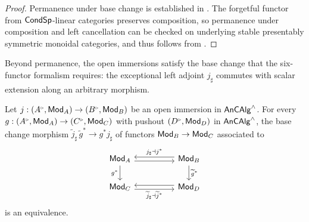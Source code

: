 \begin{proof}
    Permanence under base change is established in . The forgetful functor from $\mathsf{Cond}\mathsf{Sp}$-linear categories preserves composition, so permanence under composition and left cancellation can be checked on underlying stable presentably symmetric monoidal categories, and thus follows from \cite[Prop. 6.5 \& Cor. 6.6]{Complex}. 
\end{proof}
Beyond permanence, the open immersions satisfy the base change that the six-functor formalism requires: the exceptional left adjoint $j_{\sharp}$ commutes with scalar extension along an arbitrary morphism.
\begin{proposition}\label{prop: base change for open immersions}
    Let $j:(A^{\tri},\Mod_{A})\to(B^{\tri},\Mod_{B})$ be an open immersion in $\mathsf{An}\mathsf{CAlg}^{\wedge}$. For every $g:(A^{\tri},\Mod_{A})\to(C^{\tri},\Mod_{C})$ with pushout $(D^{\tri},\Mod_{D})$ in $\mathsf{An}\mathsf{CAlg}^{\wedge}$, the base change morphism $\widetilde{j}_{\sharp}\,\widetilde{g}^{*}\to g^{*}j_{\sharp}$ of functors $\mathsf{Mod}_{B}\to\mathsf{Mod}_{C}$ associated to
    \begin{equation}\label{eqn: open immersion base change}
        \begin{tikzcd}
            {\Mod_{A}} && {\Mod_{B}} \\
            {\Mod_{C}} && {\Mod_{D}}
            \arrow[shift right, from=1-1, to=1-3]
            \arrow["{g^{*}}"', from=1-1, to=2-1]
            \arrow["{j_{\sharp}\dashv j^{*}}"', shift right, from=1-3, to=1-1]
            \arrow["{\widetilde{g}^{*}}", from=1-3, to=2-3]
            \arrow["{\widetilde{j}_{\sharp}\dashv\widetilde{j}^{*}}"', shift right, from=2-1, to=2-3]
            \arrow[shift right, from=2-3, to=2-1]
        \end{tikzcd}
    \end{equation}
    is an equivalence.
\end{proposition}
